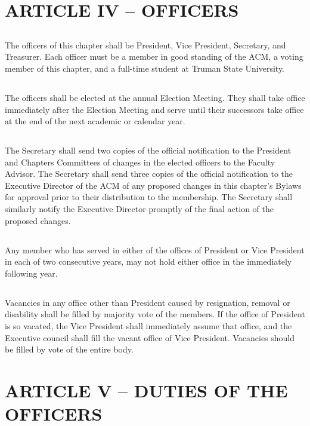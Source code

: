 \documentclass[12pt]{article}
\begin{document}
\section{ARTICLE IV – OFFICERS}
\subsection{}	The officers of this chapter shall be President, Vice President, Secretary, and Treasurer. Each officer must be a member in good standing of the ACM, a voting member of this chapter, and a full-time student at Truman State University.
\subsection{}	The officers shall be elected at the annual Election Meeting. They shall take office immediately after the Election Meeting and serve until their successors take office at the end of the next academic or calendar year.
\subsection{}	The Secretary shall send two copies of the official notification to the President and Chapters Committees of changes in the elected officers to the Faculty Advisor. The Secretary shall send three copies of the official notification to the Executive Director of the ACM of any proposed changes in this chapter's Bylaws for approval prior to their distribution to the membership. The Secretary shall similarly notify the Executive Director promptly of the final action of the proposed changes.
\subsection{}	Any member who has served in either of the offices of President or Vice President in each of two consecutive years, may not hold either office in the immediately following year.
\subsection{}	Vacancies in any office other than President caused by resignation, removal or disability shall be filled by majority vote of the members. If the office of President is so vacated, the Vice President shall immediately assume that office, and the Executive council shall fill the vacant office of Vice President. Vacancies should be filled by vote of the entire body.

\section{ARTICLE V – DUTIES OF THE OFFICERS}
\end{document}
